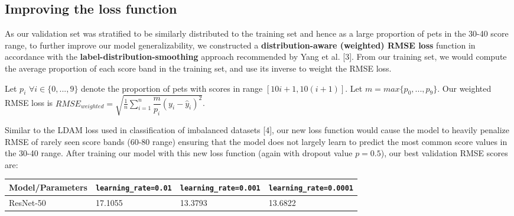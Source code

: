 \documentclass[12pt]{article}
\begin{document}




\subsection{Improving the loss function}

As our validation set was stratified to be similarly distributed to the training set and hence as a large proportion of pets in the 30-40 score range, to further improve our model generalizability, we constructed a \textbf{distribution-aware (weighted) RMSE loss} function in accordance with the \textbf{label-distribution-smoothing} approach recommended by Yang et al. [3]. From our training set, we would compute the average proportion of each score band in the training set, and use its inverse to weight the RMSE loss.\newline

Let $p_i$ $\forall i \in \{0,...,9\}$ denote the proportion of pets with scores in range $[10i+1,10(i+1)]$. Let $m=max\{p_0,...,p_9\}$. Our weighted RMSE loss is $RMSE_{weighted}=\sqrt{\frac{1}{n} \sum_{i=1}^{n} \dfrac{m}{p_i}(y_i - \hat{y}_i)^2}$.\newline

Similar to the LDAM loss used in classification of imbalanced datasets [4], our new loss function would cause the model to heavily penalize RMSE of rarely seen score bands (60-80 range) ensuring that the model does not largely learn to predict the most common score values in the 30-40 range. After training our model with this new loss function (again with dropout value $p=0.5$), our best validation RMSE scores are:

\begin{center}
\begin{tabular}{ | m{3.4cm} | m{4cm}| m{4cm} | m{4cm} | } 
  \hline
  Model/Parameters & \texttt{learning\_rate=0.01} & \texttt{learning\_rate=0.001} & \texttt{learning\_rate=0.0001}\\ 
  \hline
  ResNet-50 & 17.1055 & 13.3793 & 13.6822 \\ 
  \hline
\end{tabular}
\end{center}
\end{document}
